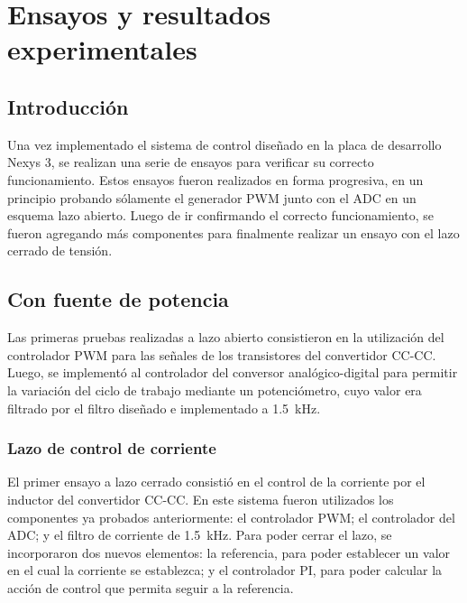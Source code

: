 \chapter{Ensayos y resultados experimentales}

\section{Introducción}

Una vez implementado el sistema de control diseñado en la placa de desarrollo Nexys 3, se realizan una serie de ensayos para verificar su correcto funcionamiento. Estos ensayos fueron realizados en forma progresiva, en un principio probando sólamente el generador PWM junto con el ADC en un esquema lazo abierto. Luego de ir confirmando el correcto funcionamiento, se fueron agregando más componentes para finalmente realizar un ensayo con el lazo cerrado de tensión.

\section{Con fuente de potencia}

Las primeras pruebas realizadas a lazo abierto consistieron en la utilización del controlador PWM para las señales de los transistores del convertidor CC-CC. Luego, se implementó al controlador del conversor analógico-digital para permitir la variación del ciclo de trabajo mediante un potenciómetro, cuyo valor era filtrado por el filtro diseñado e implementado a \SI{1.5}{\kilo\hertz}.

\subsection{Lazo de control de corriente}

El primer ensayo a lazo cerrado consistió en el control de la corriente por el inductor del convertidor CC-CC. En este sistema fueron utilizados los componentes ya probados anteriormente: el controlador PWM; el controlador del ADC; y el filtro de corriente de \SI{1.5}{\kilo\hertz}. Para poder cerrar el lazo, se incorporaron dos nuevos elementos: la referencia, para poder establecer un valor en el cual la corriente se establezca; y el controlador PI, para poder calcular la acción de control que permita seguir a la referencia.

